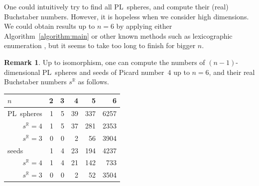\documentclass[11pt]{amsart}
\theoremstyle{plain}
\numberwithin{equation}{section}
\theoremstyle{definition}
\newtheorem{remark}[theorem]{Remark}
\newcommand{\R}{\mathbb{R}}
\begin{document}
One could intuitively try to find all PL~spheres,
and compute their (real) Buchstaber numbers.
However, it is hopeless when we consider high dimensions.
We could obtain results up to $n=6$ by applying either Algorithm~\ref{algorithm:main} or other known methods such as lexicographic enumeration \cite{Sulanke-Lutz2009}, but it seems to take too long to finish for bigger $n$.
\begin{remark}\label{theorem:buchstaber_number}
	Up to isomorphism, one can compute the numbers of $(n-1)$-dimensional PL~spheres and seeds of Picard number~$4$ up to $n=6$, and their real Buchstaber numbers $s^\R$ as follows.
\begin{center}
		\begin{tabular}{lrrrrrr}
		\toprule
		$n$   &        & 2 & 3  & 4  & 5  & 6  \tabularnewline \midrule
		\multicolumn{2}{l}{PL~spheres}   & 1  & 5  & 39 & 337 & 6257 \tabularnewline  \rule{0pt}{3ex}
		&$s^\R=4$           & 1  & 5  & 37 & 281 & 2353 \tabularnewline
		&$s^\R=3$           & 0  & 0  & 2  & 56  & 3904 \tabularnewline \midrule
		\multicolumn{2}{l}{seeds} & 1  & 4  & 23 & 194 & 4237 \tabularnewline \rule{0pt}{3ex}
		&$s^\R=4$           & 1  & 4  & 21 & 142 & 733  \tabularnewline
		&$s^\R=3$           & 0  & 0  & 2  & 52  & 3504 \tabularnewline
		\bottomrule
	\end{tabular}
\end{center}
\end{remark}
\end{document}
